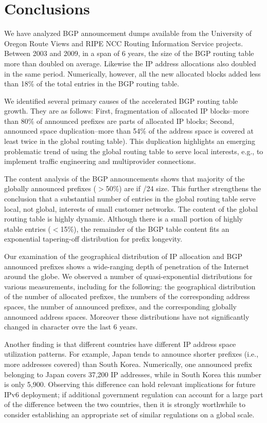 \section{Conclusions}
\label{sec:conclusions}

We have analyzed BGP announcement dumps available from the University of Oregon
Route Views and RIPE NCC Routing Information Service projects. Between 2003 and
2009, in a span of 6 years, the size of the BGP routing table more than doubled
on average. Likewise the IP address allocations also doubled in the same
period. Numerically, however, all the new allocated blocks added less than 18\%
of the total entries in the BGP routing table.

We identified several primary causes of the accelerated BGP routing table
growth.  They are as follows: First, fragmentation of allocated IP blocks--more
than 80\% of announced prefixes are parts of allocated IP blocks; Second,
announced space duplication--more than 54\% of the address space is covered at
least twice in the global routing table). This duplication highlights an
emerging problematic trend of using the global routing table to serve local
interests, e.g., to implement traffic engineering and multiprovider
connections.

The content analysis of the BGP announcements shows that majority of the
globally announced prefixes ($>$50\%) are if /24 size. This further strengthens
the conclusion that a substantial number of entries in the global routing table
serve local, not global, interests of small customer networks. The content of
the global routing table is highly dynamic. Although there is a small portion
of highly stable entries ($<$15\%), the remainder of the BGP table content fits
an exponential tapering-off distribution for prefix longevity.

Our examination of the geographical distribution of IP allocation and BGP
announced prefixes shows a wide-ranging depth of penetration of the Internet
around the globe. We observed a number of quasi-exponential distributions for
various measurements, including for the following: the geographical
distribution of the number of allocated prefixes, the numbers of the
corresponding address spaces, the number of announced prefixes, and the
corresponding globally announced address spaces. Moreover these distributions
have not significantly changed in character ovre the last 6 years.

Another finding is that different countries have different IP address space
utilization patterns. For example, Japan tends to announce shorter prefixes
(i.e., more addresses covered) than South Korea. Numerically, one announced
prefix belonging to Japan covers 37,200 IP addresses, while in South Korea this
number is only 5,900. Observing this difference can hold relevant implications
for future IPv6 deployment; if additional government regulation can account for
a large part of the difference between the two countries, then it is strongly
worthwhile to consider establishing an appropriate set of similar regulations
on a global scale.

